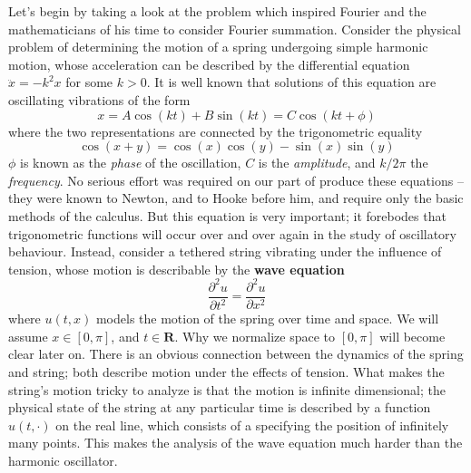 Let's begin by taking a look at the problem which inspired Fourier and the mathematicians of his time to consider Fourier summation. Consider the physical problem of determining the motion of a spring undergoing simple harmonic motion, whose acceleration can be described by the differential equation $\ddot{x} = -k^2x$ for some $k > 0$. It is well known that solutions of this equation are oscillating vibrations of the form
%
\[ x = A \cos(kt) + B \sin(kt) = C \cos(kt + \phi) \]
%
where the two representations are connected by the trigonometric equality
%
\[ \cos(x + y) = \cos(x) \cos(y) - \sin(x) \sin(y) \]
%
$\phi$ is known as the {\it phase} of the oscillation, $C$ is the {\it amplitude}, and $k/2\pi$ the {\it frequency}. No serious effort was required on our part of produce these equations -- they were known to Newton, and to Hooke before him, and require only the basic methods of the calculus. But this equation is very important; it forebodes that trigonometric functions will occur over and over again in the study of oscillatory behaviour. Instead, consider a tethered string vibrating under the influence of tension, whose motion is describable by the {\bf wave equation}
%
\[ \frac{\partial^2 u}{\partial t^2} = \frac{\partial^2 u}{\partial x^2} \]
%
where $u(t,x)$ models the motion of the spring over time and space. We will assume $x \in [0,\pi]$, and $t \in \mathbf{R}$. Why we normalize space to $[0,\pi]$ will become clear later on. There is an obvious connection between the dynamics of the spring and string; both describe motion under the effects of tension. What makes the string's motion tricky to analyze is that the motion is infinite dimensional; the physical state of the string at any particular time is described by a function $u(t,\cdot)$ on the real line, which consists of a specifying the position of infinitely many points. This makes the analysis of the wave equation much harder than the harmonic oscillator.

